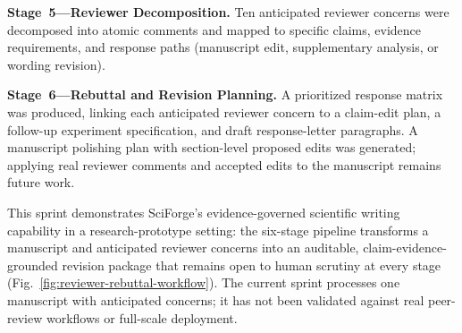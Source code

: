 \documentclass[sn-basic,Numbered,pdflatex]{sn-jnl}
\begin{document}
\textbf{Stage~5---Reviewer Decomposition.} Ten anticipated reviewer concerns were decomposed into atomic comments and mapped to specific claims, evidence requirements, and response paths (manuscript edit, supplementary analysis, or wording revision).

\textbf{Stage~6---Rebuttal and Revision Planning.} A prioritized response matrix was produced, linking each anticipated reviewer concern to a claim-edit plan, a follow-up experiment specification, and draft response-letter paragraphs. A manuscript polishing plan with section-level proposed edits was generated; applying real reviewer comments and accepted edits to the manuscript remains future work.

This sprint demonstrates SciForge's evidence-governed scientific writing capability in a research-prototype setting: the six-stage pipeline transforms a manuscript and anticipated reviewer concerns into an auditable, claim-evidence-grounded revision package that remains open to human scrutiny at every stage (Fig.~\ref{fig:reviewer-rebuttal-workflow}). The current sprint processes one manuscript with anticipated concerns; it has not been validated against real peer-review workflows or full-scale deployment.
\end{document}
